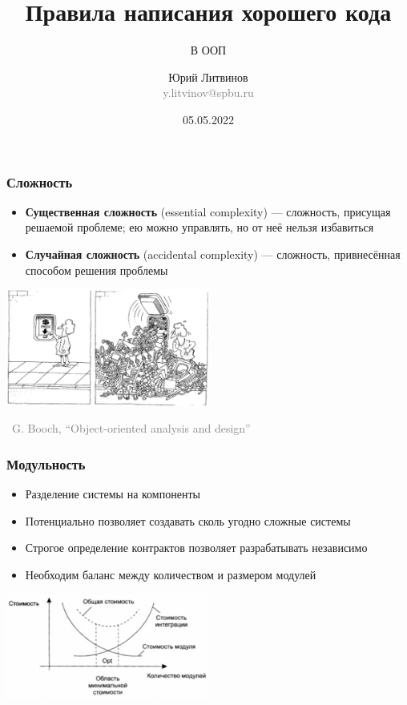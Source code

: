 \documentclass[xetex,mathserif,serif]{beamer}
\title{Правила написания хорошего кода}
\subtitle{В ООП}
\author[Юрий Литвинов]{Юрий Литвинов\\\small{\textcolor{gray}{y.litvinov@spbu.ru}}}
\date{05.05.2022}
\newcommand{\attribution}[1] {
\vspace{-5mm}\begin{flushright}\begin{scriptsize}\textcolor{gray}{\textcopyright\, #1}\end{scriptsize}\end{flushright}
}
\begin{document}
	\frame{\titlepage}

	\begin{frame}
		\frametitle{Сложность}
		\begin{itemize}
			\item \textbf{Существенная сложность} (essential complexity) --- сложность, присущая решаемой проблеме; ею можно управлять, но от неё нельзя избавиться
			\item \textbf{Случайная сложность} (accidental complexity) --- сложность, привнесённая способом решения проблемы
		\end{itemize}
		\vskip 0.5cm
		\begin{center}
			\includegraphics[width=0.5\textwidth]{complexityHiding.png}
		\end{center}
		\attribution{G. Booch, ``Object-oriented analysis and design''}
	\end{frame}

	\begin{frame}
		\frametitle{Модульность}
		\begin{itemize}
			\item Разделение системы на компоненты
			\item Потенциально позволяет создавать сколь угодно сложные системы
			\item Строгое определение контрактов позволяет разрабатывать независимо
			\item Необходим баланс между количеством и размером модулей
		\end{itemize}
		\vskip 1cm
		\begin{center}
			\includegraphics[width=0.5\textwidth]{modulesCost.png}
		\end{center}
	\end{frame}
\end{document}
